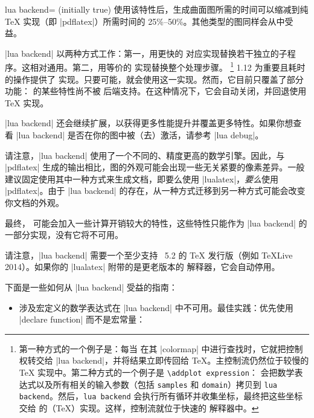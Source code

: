 {\begin{pgfplotskey}{lua backend= (initially true)}
    使用该特性后，生成曲面图所需的时间可以缩减到纯 \TeX{} 实现（即 |pdflatex|）所需时间的 25\%--50\%。其他类型的图同样会从中受益。

    |lua backend| 以两种方式工作：第一，用更快的 \lua 对应实现替换若干独立的子程序。这相对通用。第二，用等价的 \lua 实现替换整个处理步骤。%
    \footnote{
        第一种方式的一个例子是：每当 \PGFPlots{} 在其 |colormap| 中进行查找时，它就把控制权转交给 |lua backend|，并将结果立即传回给 \TeX{}。主控制流仍然位于较慢的 \TeX{} 实现中。第二种方式的一个例子是 \texttt{\textbackslash addplot expression}：\PGFPlots{} 会把数学表达式以及所有相关的输入参数（包括 \texttt{samples} 和 \texttt{domain}）拷贝到 \texttt{lua backend}。然后，\texttt{lua backend} 会执行所有循环并收集坐标，最终把这些坐标交给 \pgfname{} 的（\TeX{}）实现。这样，控制流就位于快速的 \lua{} 解释器中。
    }
    \PGFPlots{} 1.12 为重要且耗时的操作提供了 \lua{} 实现。只要可能，就会使用这一实现。然而，它目前只覆盖了部分功能：\PGFPlots{} 的某些特性尚不被 \lua{} 后端支持。在这种情况下，它会自动关闭，并回退使用 \TeX{} 实现。

    |lua backend| 还会继续扩展，以获得更多性能提升并覆盖更多特性。如果你想查看 |lua backend| 是否在你的图中被（去）激活，请参考 |lua debug|。

    请注意，|lua backend| 使用了一个不同的、精度更高的数学引擎。因此，与 |pdflatex| 生成的输出相比，图的外观可能会出现一些无关紧要的像素差异。一般建议固定使用其中一种方式来生成文档，即要么使用 |lualatex|，\emph{要么}使用 |pdflatex|。由于 |lua backend| 的存在，从一种方式迁移到另一种方式可能会改变你文档的外观。

    最终，\PGFPlots{} 可能会加入一些计算开销较大的特性，这些特性只能作为 |lua backend| 的一部分实现，没有它将不可用。

    请注意，|lua backend| 需要一个至少支持 \lua~5.2 的 \TeX{} 发行版（例如 \TeX{}Live 2014）。如果你的 |lualatex| 附带的是更老版本的 \lua{} 解释器，它会自动停用。

    下面是一些如何从 |lua backend| 受益的指南：
    \begin{itemize}
        \item 涉及宏定义的数学表达式在 |lua backend| 中不可用。最佳实践：优先使用 |declare function| 而不是宏常量：
\begin{codeexample}[]
\end{codeexample}


\end{itemize}
\end{pgfplotskey}}

